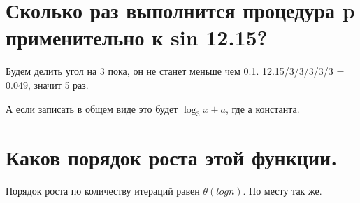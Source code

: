 \section{Сколько раз выполнится процедура p применительно к sin 12.15?}

Будем делить угол на 3 пока, он не станет меньше чем 0.1. 12.15/3/3/3/3/3 = 0.049, значит 5 раз.

А если записать в общем виде это будет $\log_3{x} + a$, где а константа.

\section{Каков порядок роста этой функции.}

Порядок роста по количеству итераций равен $\theta(log{n})$.
По месту так же.